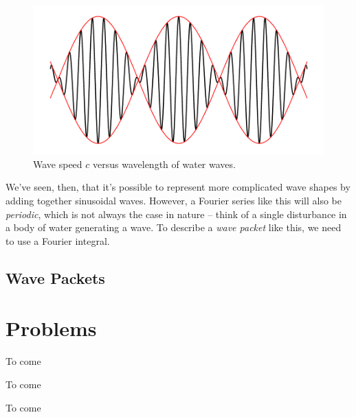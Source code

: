 \begin{figure}
\centering\includegraphics[width=0.8\linewidth]{Figures/Chapter5/fig_two_cosines}
\caption{Wave speed $c$ versus wavelength of water waves.}
\label{fig_two_cosines}
\end{figure}

We've seen, then, that it's possible to represent more complicated wave shapes by adding together sinusoidal waves.  However, a Fourier series like this will also be \emph{periodic}, which is not always the case in nature -- think of a single disturbance in a body of water generating a wave.  To describe a \emph{wave packet} like this, we need to use a Fourier integral.


\subsection{Wave Packets}



%
%







\section*{Problems}
%

\begin{problem}
\label{prob_finite_depth}
To come
\end{problem}

\begin{problem}
\label{prob_grav_cap_dispersion}
To come
\end{problem}

\begin{problem}
\label{prob_two_cosines}
To come
\end{problem}

